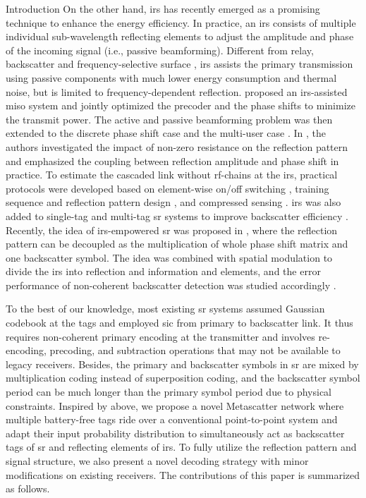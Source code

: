 \documentclass[journal]{IEEEtran}
\begin{document}
\begin{section}{Introduction}
	On the other hand, \gls{irs} has recently emerged as a promising technique to enhance the energy efficiency.
	In practice, an \gls{irs} consists of multiple individual sub-wavelength reflecting elements to adjust the amplitude and phase of the incoming signal (i.e., passive beamforming).
	Different from relay, backscatter and frequency-selective surface \cite{Anwar2018}, \gls{irs} assists the primary transmission using passive components with much lower energy consumption and thermal noise, but is limited to frequency-dependent reflection.
	\cite{Wu2018} proposed an \gls{irs}-assisted \gls{miso} system and jointly optimized the precoder and the phase shifts to minimize the transmit power.
	The active and passive beamforming problem was then extended to the discrete phase shift case \cite{Wu2019a} and the multi-user case \cite{Wu2019}.
	In \cite{Abeywickrama2020}, the authors investigated the impact of non-zero resistance on the reflection pattern and emphasized the coupling between reflection amplitude and phase shift in practice.
	To estimate the cascaded link without \gls{rf}-chains at the \gls{irs}, practical protocols were developed based on element-wise on/off switching \cite{Nadeem2019}, training sequence and reflection pattern design \cite{You2019,Kang2020}, and compressed sensing \cite{Wang2020}.
	\gls{irs} was also added to single-tag and multi-tag \gls{sr} systems to improve backscatter efficiency \cite{Chen2021,Zhang2021d}.
	Recently, the idea of \gls{irs}-empowered \gls{sr} was proposed in \cite{Xu2020b,Hua2022}, where the reflection pattern can be decoupled as the multiplication of whole phase shift matrix and one backscatter symbol.
	The idea was combined with spatial modulation to divide the \gls{irs} into reflection and information and elements, and the error performance of non-coherent backscatter detection was studied accordingly \cite{Hu2021a}.

	To the best of our knowledge, most existing \gls{sr} systems \cite{Yang2018,Guo2019b,Ding2020,Long2020a,Zhou2019a,Wu2021a,Xu2021a} assumed Gaussian codebook at the tags and employed \gls{sic} from primary to backscatter link.
	It thus requires non-coherent primary encoding at the transmitter and involves re-encoding, precoding, and subtraction operations that may not be available to legacy receivers.
	Besides, the primary and backscatter symbols in \gls{sr} are mixed by multiplication coding instead of superposition coding, and the backscatter symbol period can be much longer than the primary symbol period due to physical constraints.
	Inspired by above, we propose a novel Metascatter network where multiple battery-free tags ride over a conventional point-to-point system and adapt their input probability distribution to simultaneously act as backscatter tags of \gls{sr} and reflecting elements of \gls{irs}.
	To fully utilize the reflection pattern and signal structure, we also present a novel decoding strategy with minor modifications on existing receivers.
	The contributions of this paper is summarized as follows.



\end{section}
\end{document}
